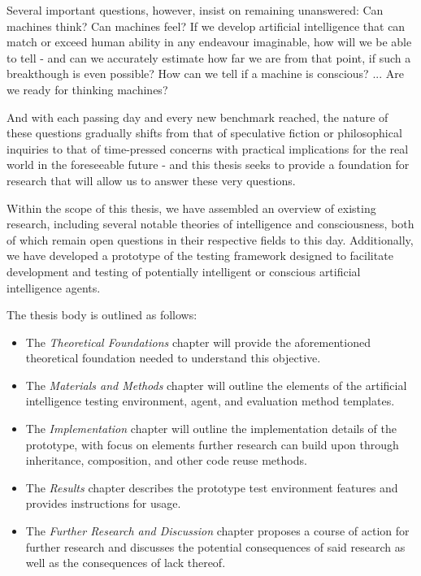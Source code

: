 \documentclass[masterthesis]{fer}
\begin{document}
Several important questions, however, insist on remaining unanswered: Can machines think? Can machines feel? If we develop artificial intelligence that can match or exceed human ability in any endeavour imaginable, how will we be able to tell - and can we accurately estimate how far we are from that point, if such a breakthough is even possible? How can we tell if a machine is conscious? ... Are we ready for thinking machines?

And with each passing day and every new benchmark reached, the nature of these questions gradually shifts from that of speculative fiction or philosophical inquiries to that of time-pressed concerns with practical implications for the real world in the foreseeable future - and this thesis seeks to provide a foundation for research that will allow us to answer these very questions.

Within the scope of this thesis, we have assembled an overview of existing research, including several notable theories of intelligence and consciousness, both of which remain open questions in their respective fields to this day. Additionally, we have developed a prototype of the testing framework designed to facilitate development and testing of potentially intelligent or conscious artificial intelligence agents.

The thesis body is outlined as follows:
\begin{itemize}
\item{The \textit{Theoretical Foundations} chapter will provide the aforementioned theoretical foundation needed to understand this objective.}
\item{The \textit{Materials and Methods} chapter will outline the elements of the artificial intelligence testing environment, agent, and evaluation method templates.}
\item{The \textit{Implementation} chapter will outline the implementation details of the prototype, with focus on elements further research can build upon through inheritance, composition, and other code reuse methods.}
\item{The \textit{Results} chapter describes the prototype test environment features and provides instructions for usage.}
\item{The \textit{Further Research and Discussion} chapter proposes a course of action for further research and discusses the potential consequences of said research as well as the consequences of lack thereof.}
\end{itemize}
\end{document}
